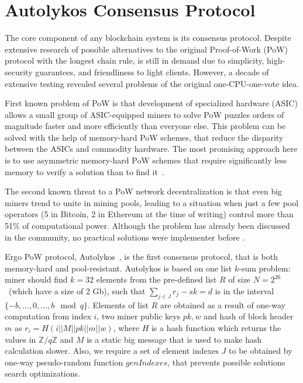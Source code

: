 \section{Autolykos Consensus Protocol}
\label{sec:autolykos}


The core component of any blockchain system is its consensus protocol.
Despite extensive research of possible alternatives to the original Proof-of-Work (PoW) protocol
with the longest chain rule,
is still in demand due to simplicity, high-security guarantees, and friendliness to light clients.
However, a decade of extensive testing revealed several problems of the original one-CPU-one-vote idea.

First known problem of PoW is that development of specialized hardware (ASIC) allows
a small group of ASIC-equipped miners to solve PoW puzzles orders of magnitude faster and more efficiently
than everyone else. This problem can be solved with the help of memory-hard PoW schemes,
that reduce the disparity between the ASICs and commodity hardware. The most promising approach here
is to use asymmetric memory-hard PoW schemes that require significantly less memory
to verify a solution than to find it~\cite{biryukov2017equihash,ethHash}.

The second known threat to a PoW network decentralization is that even big miners trend to unite in
mining pools, leading to a situation when just a few pool operators (5 in Bitcoin, 2 in Ethereum
at the time of writing) control more than 51\% of computational power.
Although the problem has already been discussed in the community, no practical solutions were
implementer before \Ergo{}.


Ergo PoW protocol, Autolykos~\cite{Ergopow}, is the first consensus protocol, that is both memory-hard
and pool-resistant.
Autolykos is based on one list $k$-sum problem: miner should find
$k=32$ elements from the pre-defined list $R$ of size $N=2^{26}$~(which have a size of 2 Gb),
such that $\sum_{j \in J} r_{j} - sk = d$ is in the interval $\{-b,\dots,0,\dots,b\mod q\}$.
Elements of list $R$ are obtained as a result of one-way computation from index $i$,
two miner public keys $pk,w$ and hash of block header $m$ as $r_i=H(i||M||pk||m||w)$,
where $H$ is a hash function which returns the values in $\mathbb{Z}/q\mathbb{Z}$ and
$M$ is a static big message that is used to make hash calculation slower.
Also, we require a set of element indexes $J$ to be obtained
by one-way pseudo-random function $genIndexes$, that prevents possible solutions
search optimizations.

